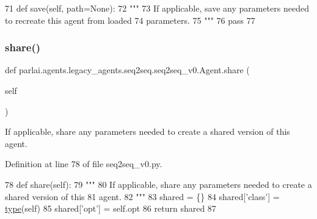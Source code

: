 \begin{DoxyCode}
71     \textcolor{keyword}{def }save(self, path=None):
72         \textcolor{stringliteral}{"""}
73 \textcolor{stringliteral}{        If applicable, save any parameters needed to recreate this agent from loaded}
74 \textcolor{stringliteral}{        parameters.}
75 \textcolor{stringliteral}{        """}
76         \textcolor{keywordflow}{pass}
77 
\end{DoxyCode}
\mbox{\label{classparlai_1_1agents_1_1legacy__agents_1_1seq2seq_1_1seq2seq__v0_1_1Agent_a76e7a147dd6740bd60f696a5f0c34e5a}} 
\subsubsection{\texorpdfstring{share()}{share()}}
{\footnotesize\ttfamily def parlai.\+agents.\+legacy\+\_\+agents.\+seq2seq.\+seq2seq\+\_\+v0.\+Agent.\+share (\begin{DoxyParamCaption}\item[{}]{self }\end{DoxyParamCaption})}

\begin{DoxyVerb}If applicable, share any parameters needed to create a shared version of this
agent.
\end{DoxyVerb}
 

Definition at line 78 of file seq2seq\+\_\+v0.\+py.


\begin{DoxyCode}
78     \textcolor{keyword}{def }share(self):
79         \textcolor{stringliteral}{"""}
80 \textcolor{stringliteral}{        If applicable, share any parameters needed to create a shared version of this}
81 \textcolor{stringliteral}{        agent.}
82 \textcolor{stringliteral}{        """}
83         shared = \{\}
84         shared[\textcolor{stringliteral}{'class'}] = \hyperlink{namespaceparlai_1_1agents_1_1tfidf__retriever_1_1build__tfidf_ad5dfae268e23f506da084a9efb72f619}{type}(self)
85         shared[\textcolor{stringliteral}{'opt'}] = self.opt
86         \textcolor{keywordflow}{return} shared
87 
\end{DoxyCode}
\mbox{\label{classparlai_1_1agents_1_1legacy__agents_1_1seq2seq_1_1seq2seq__v0_1_1Agent_af8eca4b6d832aa2b55ac191324105c43}} 
